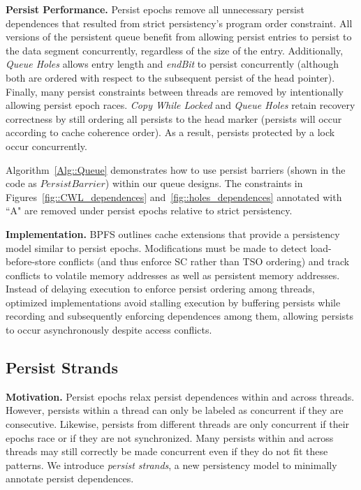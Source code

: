 \textbf{Persist Performance.}
Persist epochs remove all unnecessary persist dependences that resulted from strict persistency's program order constraint.
All versions of the persistent queue benefit from allowing persist entries to persist to the data segment concurrently, regardless of the size of the entry.
Additionally, \emph{Queue Holes} allows entry length and \emph{endBit} to persist concurrently (although both are ordered with respect to the subsequent persist of the head pointer).
Finally, many persist constraints between threads are removed by intentionally allowing persist epoch races.
\emph{Copy While Locked} and \emph{Queue Holes} retain recovery correctness by still ordering all persists to the head marker (persists will occur according to cache coherence order).
As a result, persists protected by a lock occur concurrently.

Algorithm~\ref{Alg::Queue} demonstrates how to use persist barriers (shown in the code as $PersistBarrier$) within our queue designs.
The constraints in Figures~\ref{fig::CWL_dependences} and~\ref{fig::holes_dependences} annotated with ``A" are removed under persist epochs relative to strict persistency.

\textbf{Implementation.}
BPFS \cite{Condit09} outlines cache extensions that provide a persistency model similar to persist epochs.
Modifications must be made to detect load-before-store conflicts (and thus enforce SC rather than TSO ordering) and track conflicts to volatile memory addresses as well as persistent memory addresses.
Instead of delaying execution to enforce persist ordering among threads, optimized implementations avoid stalling execution by buffering persists while recording and subsequently enforcing dependences among them, allowing persists to occur asynchronously despite access conflicts.

\subsection{Persist Strands}
\label{section:PersistencyModels:PersistStrands}

\textbf{Motivation.}
Persist epochs relax persist dependences within and across threads.
However, persists within a thread can only be labeled as concurrent if they are consecutive.
Likewise, persists from different threads are only concurrent if their epochs race or if they are not synchronized.
Many persists within and across threads may still correctly be made concurrent even if they do not fit these patterns.
We introduce \emph{persist strands}, a new persistency model to minimally annotate persist dependences.

